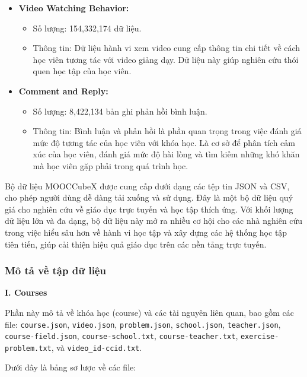 \begin{itemize}
    \item \textbf{Video Watching Behavior:}
    \begin{itemize}
        \item Số lượng: 154,332,174 dữ liệu.
        \item Thông tin: Dữ liệu hành vi xem video cung cấp thông tin chi tiết về cách học viên tương tác với video giảng dạy. Dữ liệu này giúp nghiên cứu thói quen học tập của học viên.
    \end{itemize}

    \item \textbf{Comment and Reply:}
    \begin{itemize}
        \item Số lượng: 8,422,134 bản ghi phản hồi bình luận.
        \item Thông tin: Bình luận và phản hồi là phần quan trọng trong việc đánh giá mức độ tương tác của học viên với khóa học. Là cơ sở để phân tích cảm xúc của học viên, đánh giá mức độ hài lòng và tìm kiếm những khó khăn mà học viên gặp phải trong quá trình học.
    \end{itemize}
\end{itemize}

Bộ dữ liệu MOOCCubeX được cung cấp dưới dạng các tệp tin JSON và CSV, cho phép người dùng dễ dàng tải xuống và sử dụng. Đây là một bộ dữ liệu quý giá cho nghiên cứu về giáo dục trực tuyến và học tập thích ứng. Với khối lượng dữ liệu lớn và đa dạng, bộ dữ liệu này mở ra nhiều cơ hội cho các nhà nghiên cứu trong việc hiểu sâu hơn về hành vi học tập và xây dựng các hệ thống học tập tiên tiến, giúp cải thiện hiệu quả giáo dục trên các nền tảng trực tuyến.

\subsubsection{Mô tả về tập dữ liệu}

\textbf{I. Courses}

Phần này mô tả về khóa học (course) và các tài nguyên liên quan, bao gồm các file: \texttt{course.json}, \texttt{video.json}, \texttt{problem.json}, \texttt{school.json}, \texttt{teacher.json}, \texttt{course-field.json}, \texttt{course-school.txt}, \texttt{course-teacher.txt}, \texttt{exercise-problem.txt}, và \texttt{video\_id-ccid.txt}.

Dưới đây là bảng sơ lược về các file:

